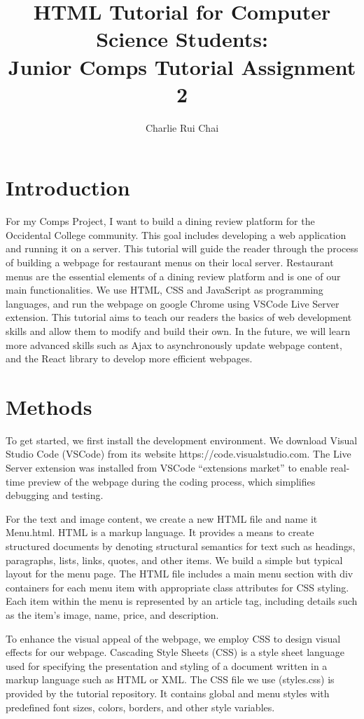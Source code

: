 \documentclass[10pt,twocolumn]{article}
\title{HTML Tutorial for Computer Science Students:\\
Junior Comps Tutorial Assignment 2}
\author{Charlie Rui Chai}
\affiliation{Occidental College}
\begin{document}
\maketitle

\section{Introduction}
For my Comps Project, I want to build a dining review platform for the Occidental College community. This goal includes developing a web application and running it on a server. This tutorial will guide the reader through the process of building a webpage for restaurant menus on their local server. Restaurant menus are the essential elements of a dining review platform and is one of our main functionalities. We use HTML, CSS and JavaScript as programming languages, and run the webpage on google Chrome using VSCode Live Server extension. This tutorial aims to teach our readers the basics of web development skills and allow them to modify and build their own. In the future, we will learn more advanced skills such as Ajax to asynchronously update webpage content, and the React library to develop more efficient webpages.

\section{Methods}

To get started, we first install the development environment. We download Visual Studio Code (VSCode) from its website https://code.visualstudio.com. The Live Server extension was installed from VSCode “extensions market” to enable real-time preview of the webpage during the coding process, which simplifies debugging and testing. 

For the text and image content, we create a new HTML file and name it Menu.html. HTML is a markup language. It provides a means to create structured documents by denoting structural semantics for text such as headings, paragraphs, lists, links, quotes, and other items. We build a simple but typical layout for the menu page. The HTML file includes a main menu section with div containers for each menu item with appropriate class attributes for CSS styling. Each item within the menu is represented by an article tag, including details such as the item’s image, name, price, and description. 

To enhance the visual appeal of the webpage, we employ CSS to design visual effects for our webpage. Cascading Style Sheets (CSS) is a style sheet language used for specifying the presentation and styling of a document written in a markup language such as HTML or XML. The CSS file we use (styles.css) is provided by the tutorial repository. It contains global and menu styles with predefined font sizes, colors, borders, and other style variables.
\end{document}
